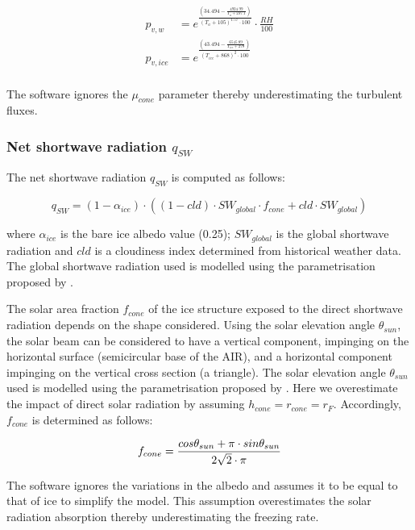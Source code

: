 \documentclass[utf8]{frontiersSCNS}
\begin{document}
\begin{equation}
	\begin{split}
		p_{v,w}&=e^{\frac{(34.494 - \frac{4924.99}{T_{a} + 237.1})}{(T_a + 105)^{1.57} \cdot 100}} \cdot \frac{RH}{100} \\
		p_{v,ice}&=e^{\frac{(43.494 - \frac{6545.89}{T_{ice} + 278})}{(T_{ice} + 868)^{2} \cdot 100}} \\
	\end{split} \label{eqn:vp}
\end{equation}

The software ignores the $\mu_{cone}$ parameter thereby underestimating the turbulent fluxes.

\subsubsection{Net shortwave radiation \texorpdfstring{$q_{SW}$}{Lg}}
\label{sec:SW}

The net shortwave radiation $q_{SW}$ is computed as follows:

\begin{equation} q_{SW} = (1- \alpha_{ice}) \cdot ( (1- cld) \cdot SW_{global} \cdot f_{cone} + cld \cdot SW_{global}) \label{eqn:SW} \end{equation}

where $\alpha_{ice}$ is the bare ice albedo value (0.25); $SW_{global}$ is the global shortwave radiation and
$cld$ is a cloudiness index determined from historical weather data. The global shortwave radiation used is modelled using the parametrisation proposed by \cite{Woolf_1968}.

The solar area fraction $f_{cone}$ of the ice structure exposed to the direct shortwave radiation depends on the
shape considered. Using the solar elevation angle $\theta_{sun}$, the solar beam can be considered to have a
vertical component, impinging on the horizontal surface (semicircular base of the AIR), and a horizontal
component impinging on the vertical cross section (a triangle). The solar elevation angle $\theta_{sun}$ used is
modelled using the parametrisation proposed by \cite{Woolf_1968}. Here we overestimate the impact of direct
solar radiation by assuming $h_{cone} = r_{cone} = r_{F}$. Accordingly, $f_{cone}$ is determined as
follows:

\begin{equation}
	\begin{split}
		f_{cone}& =\frac{ cos \theta_{sun} + \pi \cdot sin \theta_{sun} }{2\sqrt{2} \cdot \pi }\\
	\end{split}
	\label{ eqn:f_{cone} }
\end{equation}

The software ignores the variations in the albedo and assumes it to be equal to that of ice to simplify the
model. This assumption overestimates the solar radiation absorption thereby underestimating the freezing rate.

 
\end{document}
